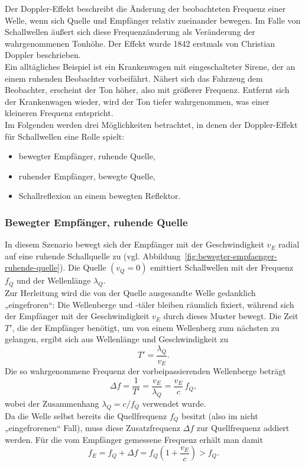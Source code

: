 \documentclass[
	german,%
	accentcolor=3d,%
	type=intern, %
	marginpar=false,%
]{tudapub}
\begin{document}
      Der Doppler-Effekt beschreibt die Änderung der beobachteten Frequenz einer Welle, wenn sich Quelle und Empfänger relativ zueinander bewegen. Im Falle von Schallwellen äußert sich diese Frequenzänderung als Veränderung der wahrgenommenen Tonhöhe. Der Effekt wurde 1842 erstmals von Christian Doppler beschrieben.
      \\
      Ein alltägliches Beispiel ist ein Krankenwagen mit eingeschalteter Sirene, der an einem ruhenden Beobachter vorbeifährt. Nähert sich das Fahrzeug dem Beobachter, erscheint der Ton höher, also mit größerer Frequenz. Entfernt sich der Krankenwagen wieder, wird der Ton tiefer wahrgenommen, was einer kleineren Frequenz entspricht.
      \\
      Im Folgenden werden drei Möglichkeiten betrachtet, in denen der Doppler-Effekt für Schallwellen eine Rolle spielt:
      \begin{itemize}
         \item bewegter Empfänger, ruhende Quelle,
         \item ruhender Empfänger, bewegte Quelle,
         \item Schallreflexion an einem bewegten Reflektor.
      \end{itemize}

   \subsubsection{Bewegter Empfänger, ruhende Quelle}\label{sec:doppler-bewegter-empfaenger}

      In diesem Szenario bewegt sich der Empfänger mit der Geschwindigkeit \(v_E\) radial auf eine ruhende Schallquelle zu (vgl. Abbildung~\ref{fig:bewegter-empfaenger-ruhende-quelle}). Die Quelle \((v_Q = 0)\) emittiert Schallwellen mit der Frequenz \(f_Q\) und der Wellenlänge \(\lambda_Q\).
      \\
      Zur Herleitung wird die von der Quelle ausgesandte Welle gedanklich „eingefroren“: Die Wellenberge und -täler bleiben räumlich fixiert, während sich der Empfänger mit der Geschwindigkeit \(v_E\) durch dieses Muster bewegt. Die Zeit \(T'\), die der Empfänger benötigt, um von einem Wellenberg zum nächsten zu gelangen, ergibt sich aus Wellenlänge und Geschwindigkeit zu
      \[
         T' = \frac{\lambda_Q}{v_E}.
      \]
      Die so wahrgenommene Frequenz der vorbeipassierenden Wellenberge beträgt
      \begin{equation}
         \Delta f = \frac{1}{T'} = \frac{v_E}{\lambda_Q}
                  = \frac{v_E}{c}\, f_Q,
         \label{eq:doppler-deltaf-empfaenger}
      \end{equation}
      wobei der Zusammenhang \(\lambda_Q = c / f_Q\) verwendet wurde.
      \\
      Da die Welle selbst bereits die Quellfrequenz \(f_Q\) besitzt (also im nicht „eingefrorenen“ Fall), muss diese Zusatzfrequenz \(\Delta f\) zur Quellfrequenz addiert werden. Für die vom Empfänger gemessene Frequenz erhält man damit
      \begin{equation}
         f_E = f_Q + \Delta f
            = f_Q \left( 1 + \frac{v_E}{c} \right)
            > f_Q .
         \label{eq:doppler-fE-empfaenger}
      \end{equation}
\end{document}
